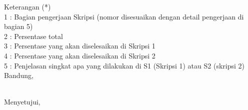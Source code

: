 \documentclass[a4paper,twoside]{article}
\begin{document}
Keterangan (*)\\
1 : Bagian pengerjaan Skripsi (nomor disesuaikan dengan detail pengerjaan di bagian 5)\\
2 : Persentase total \\
3 : Persentase yang akan diselesaikan di Skripsi 1 \\
4 : Persentase yang akan diselesaikan di Skripsi 2 \\
5 : Penjelasan singkat apa yang dilakukan di S1 (Skripsi 1) atau S2 (skripsi 2)
\newpage
\vspace{1cm}
\centering Bandung, \tanggal\\
\vspace{2cm} \nama \\ 
\vspace{1cm}

Menyetujui, \\
\end{document}
